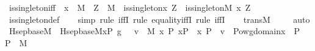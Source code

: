 \begin{isabellebody}
\isamarkupfalse%
\ is{\isacharunderscore}{\kern0pt}singleton{\isacharprime}{\kern0pt}{\isacharunderscore}{\kern0pt}iff\ {\isacharcolon}{\kern0pt}\ {\isachardoublequoteopen}x\ {\isasymin}\ M\ {\isasymLongrightarrow}\ Z\ {\isasymin}\ M\ {\isasymLongrightarrow}\ is{\isacharunderscore}{\kern0pt}singleton{\isacharprime}{\kern0pt}{\isacharparenleft}{\kern0pt}x{\isacharcomma}{\kern0pt}\ Z{\isacharparenright}{\kern0pt}\ {\isasymlongleftrightarrow}\ is{\isacharunderscore}{\kern0pt}singleton{\isacharparenleft}{\kern0pt}{\isacharhash}{\kern0pt}{\isacharhash}{\kern0pt}M{\isacharcomma}{\kern0pt}\ x{\isacharcomma}{\kern0pt}\ Z{\isacharparenright}{\kern0pt}{\isachardoublequoteclose}\ \isanewline
%
\isadelimproof
\ \ %
\endisadelimproof
%
\isatagproof
{}\isamarkupfalse%
\ is{\isacharunderscore}{\kern0pt}singleton{\isacharprime}{\kern0pt}{\isacharunderscore}{\kern0pt}def\ \isanewline
\ \ \isamarkupfalse%
{\isacharparenleft}{\kern0pt}simp{\isacharcomma}{\kern0pt}\ rule\ iffI{\isacharcomma}{\kern0pt}\ rule\ equality{\isacharunderscore}{\kern0pt}iffI{\isacharcomma}{\kern0pt}\ rule\ iffI{\isacharparenright}{\kern0pt}\isanewline
\ \ \isamarkupfalse%
\ transM\ \isanewline
\ \ \isamarkupfalse%
\ auto%
\endisatagproof
{\isafoldproof}%
%
\isadelimproof
\isanewline
%
\endisadelimproof
\isanewline
{}\isamarkupfalse%
\ Hsep{\isacharunderscore}{\kern0pt}base{\isacharunderscore}{\kern0pt}M\ \ {\isachardoublequoteopen}Hsep{\isacharunderscore}{\kern0pt}base{\isacharunderscore}{\kern0pt}M{\isacharparenleft}{\kern0pt}xP{\isacharcomma}{\kern0pt}\ g{\isacharparenright}{\kern0pt}\ {\isasymequiv}\ {\isacharbraceleft}{\kern0pt}\ v\ {\isasymin}\ M{\isachardot}{\kern0pt}\ {\isasymexists}x{\isachardot}{\kern0pt}\ {\isasymexists}P{\isachardot}{\kern0pt}\ xP\ {\isacharequal}{\kern0pt}\ {\isacharless}{\kern0pt}x{\isacharcomma}{\kern0pt}\ P{\isachargreater}{\kern0pt}\ {\isasymand}\ v\ {\isasymin}\ Pow{\isacharparenleft}{\kern0pt}{\isacharparenleft}{\kern0pt}{\isasymUnion}{\isacharparenleft}{\kern0pt}g{\isacharbackquote}{\kern0pt}{\isacharbackquote}{\kern0pt}{\isacharparenleft}{\kern0pt}domain{\isacharparenleft}{\kern0pt}x{\isacharparenright}{\kern0pt}\ {\isasymtimes}\ {\isacharbraceleft}{\kern0pt}P{\isacharbraceright}{\kern0pt}{\isacharparenright}{\kern0pt}{\isacharparenright}{\kern0pt}{\isacharparenright}{\kern0pt}\ {\isasymtimes}\ P{\isacharparenright}{\kern0pt}\ {\isasyminter}\ M\ {\isacharbraceright}{\kern0pt}{\isachardoublequoteclose}\ \isanewline
{}\isamarkupfalse%

\end{isabellebody}
